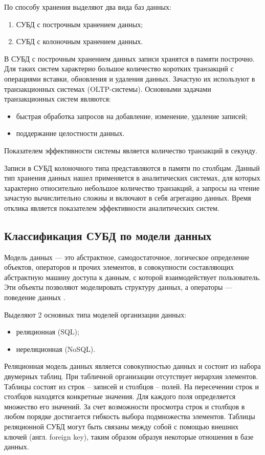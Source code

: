 По способу хранения выделяют два вида баз данных:
\begin{enumerate}
	\item СУБД с построчным хранением данных;
	\item СУБД с колоночным хранением данных.
\end{enumerate}

В СУБД с построчным хранением данных записи хранятся в памяти построчно. Для таких систем характерно большое количество коротких транзакций с операциями вставки, обновления и удаления данных. Зачастую их используют в транзакционных системах (OLTP-системы). Основными задачами транзакционных систем являются:
\begin{itemize}
	\item быстрая обработка запросов на добавление, изменение, удаление записей;
	\item поддержание целостности данных.
\end{itemize}
Показателем эффективности системы является количество транзакций в секунду.


Записи в СУБД колоночного типа представляются в памяти по столбцам.
Данный тип хранения данных нашел применяется в аналитических системах, для которых
характерно относительно небольшое количество транзакций, а запросы на чтение зачастую вычислительно сложны и включают в себя агрегацию данных. Время отклика является показателем эффективности аналитических систем.


\subsection{Классификация СУБД по модели данных}


Модель данных — это абстрактное, самодостаточное, логическое определение объектов, операторов и прочих элементов, в совокупности составляющих абстрактную машину доступа к данным, с которой взаимодействует пользователь. Эти объекты позволяют моделировать структуру данных, а операторы — поведение данных \cite{dbinfo}.

Выделяют 2 основных типа моделей организации данных:
\begin{itemize}
	\item реляционная (SQL);
	\item нереляционная (NoSQL).
\end{itemize}

Реляционная модель данных является совокупностью данных и состоит из набора двумерных таблиц. При табличной организации отсутствует иерархия элементов. Таблицы состоят из строк – записей и столбцов – полей. На пересечении строк и столбцов находятся конкретные значения. Для каждого поля определяется множество его значений. За счет возможности просмотра строк и столбцов в любом порядке достигается гибкость выбора подмножества элементов.
Таблицы реляционной СУБД могут быть связаны между собой с помощью внешних ключей (англ. foreign key), таким образом образуя некоторые отношения в базе данных.

